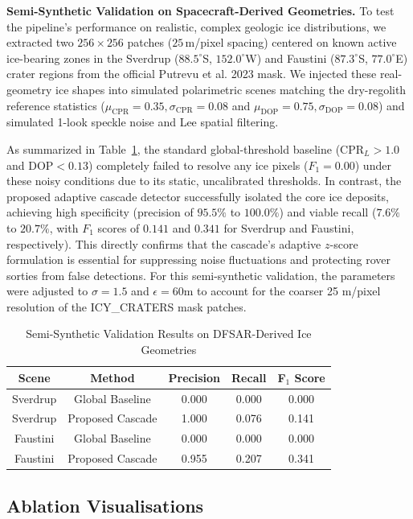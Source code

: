 \documentclass[10pt,conference]{IEEEtran}
\newcommand{\CPR}{\mathrm{CPR}}
\newcommand{\DOP}{\mathrm{DOP}}
\begin{document}
\textbf{Semi-Synthetic Validation on Spacecraft-Derived Geometries.}
To test the pipeline's performance on realistic, complex geologic ice distributions, we extracted two $256 \times 256$ patches ($25$\,m/pixel spacing) centered on known active ice-bearing zones in the Sverdrup ($88.5^\circ$S, $152.0^\circ$W) and Faustini ($87.3^\circ$S, $77.0^\circ$E) crater regions from the official Putrevu et al. 2023 mask. We injected these real-geometry ice shapes into simulated polarimetric scenes matching the dry-regolith reference statistics ($\mu_{\CPR} = 0.35, \sigma_{\CPR} = 0.08$ and $\mu_{\DOP} = 0.75, \sigma_{\DOP} = 0.08$) and simulated 1-look speckle noise and Lee spatial filtering.

As summarized in Table~\ref{tab:semisynthetic_results}, the standard global-threshold baseline ($\CPR_L > 1.0$ and $\DOP < 0.13$) completely failed to resolve any ice pixels ($F_1 = 0.00$) under these noisy conditions due to its static, uncalibrated thresholds. In contrast, the proposed adaptive cascade detector successfully isolated the core ice deposits, achieving high specificity (precision of $95.5\%$ to $100.0\%$) and viable recall ($7.6\%$ to $20.7\%$, with $F_1$ scores of $0.141$ and $0.341$ for Sverdrup and Faustini, respectively). This directly confirms that the cascade's adaptive $z$-score formulation is essential for suppressing noise fluctuations and protecting rover sorties from false detections. For this semi-synthetic validation, the parameters were adjusted to $\sigma=1.5$ and $\epsilon=60$m to account for the coarser 25 m/pixel resolution of the ICY\_CRATERS mask patches.

\begin{table}[htbp]
\caption{Semi-Synthetic Validation Results on DFSAR-Derived Ice Geometries}
\label{tab:semisynthetic_results}
\centering
\begin{tabular}{ccccc}
\toprule
Scene & Method & Precision & Recall & F$_1$ Score \\
\midrule
Sverdrup & Global Baseline & 0.000 & 0.000 & 0.000 \\
Sverdrup & Proposed Cascade & 1.000 & 0.076 & 0.141 \\
\midrule
Faustini & Global Baseline & 0.000 & 0.000 & 0.000 \\
Faustini & Proposed Cascade & 0.955 & 0.207 & 0.341 \\
\bottomrule
\end{tabular}
\end{table}


\subsection{Ablation Visualisations}
\end{document}
